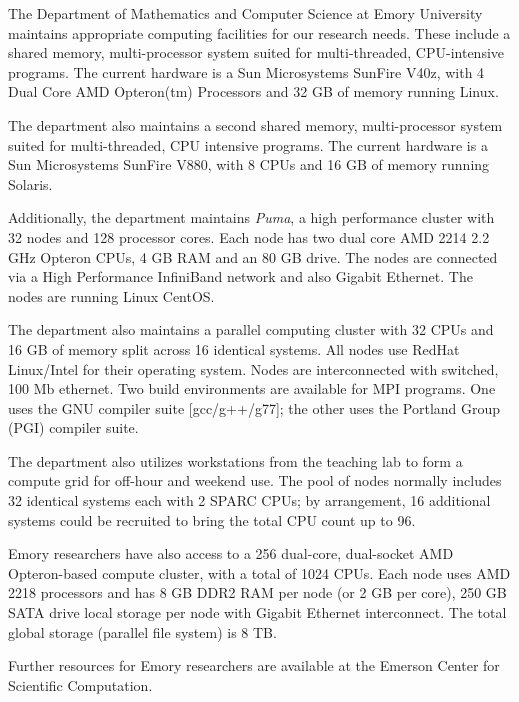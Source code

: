 
The Department of Mathematics and Computer Science at 
Emory University maintains appropriate computing facilities for our
research needs. These include
a shared memory, multi-processor system suited for multi-threaded, 
CPU-intensive programs. The current hardware is a Sun Microsystems 
SunFire V40z, with 4 Dual Core AMD Opteron(tm) Processors and 32 GB of 
memory running Linux.

The department also maintains a second shared memory, multi-processor system 
 suited for multi-threaded, CPU intensive programs. The current hardware 
is a Sun Microsystems SunFire V880, with 8 CPUs and 16 GB of memory running 
Solaris. 

Additionally,
the department maintains {\em Puma},
a high performance cluster with 32 nodes and 
128 processor cores. Each node has two dual core AMD 2214 2.2 GHz 
Opteron CPUs, 4 GB RAM and an 80 GB drive. 
The nodes are connected via a High Performance InfiniBand network and also 
Gigabit Ethernet. The nodes are running Linux CentOS. 

The department also maintains a parallel computing cluster with 
32 CPUs and 16 GB of memory split across 16 identical systems. 
All nodes use RedHat Linux/Intel for their operating system. 
Nodes are interconnected with switched, 100 Mb ethernet. 
Two build environments are available for MPI programs. 
One uses the GNU compiler suite [gcc/g++/g77]; 
the other uses the Portland Group (PGI) compiler suite.

The department also utilizes workstations from the teaching 
lab to form a compute grid for off-hour and weekend use. 
The pool of nodes normally includes 32 identical systems each 
with 2 SPARC CPUs; by arrangement, 16 additional systems could 
be recruited to bring the total CPU count up to 96. 

Emory researchers have also access to a 
256 dual-core, dual-socket AMD Opteron-based compute cluster,
with a total of 1024 CPUs.
Each node uses AMD 2218 processors and has
8 GB DDR2 RAM per node (or 2 GB per core),
250 GB SATA drive local storage per node with 
Gigabit Ethernet interconnect.
The total global storage (parallel file system)
is 8 TB.

Further resources for Emory researchers are available at the
Emerson Center for Scientific Computation. 


